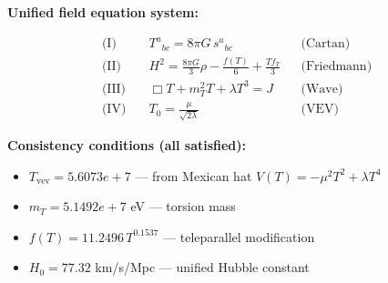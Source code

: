 
\textbf{Unified field equation system:}

\begin{align}
  \text{(I)} \quad & T^a{}_{bc} = 8\pi G \, s^a{}_{bc} && \text{(Cartan)} \\
  \text{(II)} \quad & H^2 = \frac{8\pi G}{3}\rho - \frac{f(T)}{6} + \frac{Tf_T}{3} && \text{(Friedmann)} \\
  \text{(III)} \quad & \Box T + m_T^2 T + \lambda T^3 = J && \text{(Wave)} \\
  \text{(IV)} \quad & T_0 = \frac{\mu}{\sqrt{2\lambda}} && \text{(VEV)}
\end{align}

\textbf{Consistency conditions (all satisfied):}
\begin{itemize}
  \item $T_{\text{vev}} = 5.6073e+7$ — from Mexican hat $V(T) = -\mu^2 T^2 + \lambda T^4$
  \item $m_T = 5.1492e+7$ eV — torsion mass
  \item $f(T) = 11.2496 \, T^{0.1537}$ — teleparallel modification
  \item $H_0 = 77.32$ km/s/Mpc — unified Hubble constant
\end{itemize}